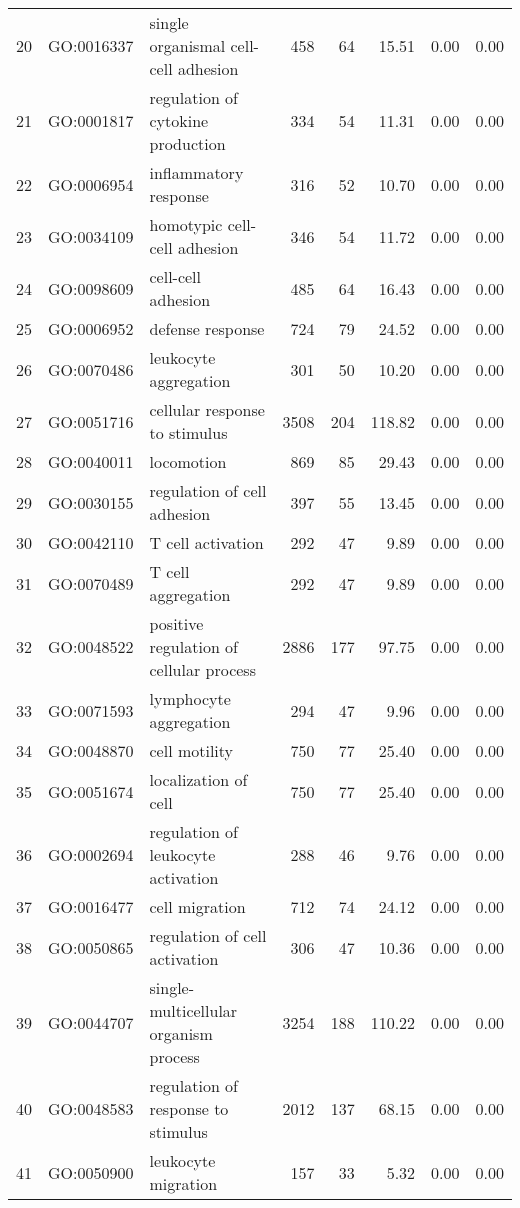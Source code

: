 \begin{table}[ht]
\begin{tabular}{rllrrrrr}
  20 & GO:0016337 & single organismal cell-cell adhesion & 458 &  64 & 15.51 & 0.00 & 0.00 \\ 
  21 & GO:0001817 & regulation of cytokine production & 334 &  54 & 11.31 & 0.00 & 0.00 \\ 
  22 & GO:0006954 & inflammatory response & 316 &  52 & 10.70 & 0.00 & 0.00 \\ 
  23 & GO:0034109 & homotypic cell-cell adhesion & 346 &  54 & 11.72 & 0.00 & 0.00 \\ 
  24 & GO:0098609 & cell-cell adhesion & 485 &  64 & 16.43 & 0.00 & 0.00 \\ 
  25 & GO:0006952 & defense response & 724 &  79 & 24.52 & 0.00 & 0.00 \\ 
  26 & GO:0070486 & leukocyte aggregation & 301 &  50 & 10.20 & 0.00 & 0.00 \\ 
  27 & GO:0051716 & cellular response to stimulus & 3508 & 204 & 118.82 & 0.00 & 0.00 \\ 
  28 & GO:0040011 & locomotion & 869 &  85 & 29.43 & 0.00 & 0.00 \\ 
  29 & GO:0030155 & regulation of cell adhesion & 397 &  55 & 13.45 & 0.00 & 0.00 \\ 
  30 & GO:0042110 & T cell activation & 292 &  47 & 9.89 & 0.00 & 0.00 \\ 
  31 & GO:0070489 & T cell aggregation & 292 &  47 & 9.89 & 0.00 & 0.00 \\ 
  32 & GO:0048522 & positive regulation of cellular process & 2886 & 177 & 97.75 & 0.00 & 0.00 \\ 
  33 & GO:0071593 & lymphocyte aggregation & 294 &  47 & 9.96 & 0.00 & 0.00 \\ 
  34 & GO:0048870 & cell motility & 750 &  77 & 25.40 & 0.00 & 0.00 \\ 
  35 & GO:0051674 & localization of cell & 750 &  77 & 25.40 & 0.00 & 0.00 \\ 
  36 & GO:0002694 & regulation of leukocyte activation & 288 &  46 & 9.76 & 0.00 & 0.00 \\ 
  37 & GO:0016477 & cell migration & 712 &  74 & 24.12 & 0.00 & 0.00 \\ 
  38 & GO:0050865 & regulation of cell activation & 306 &  47 & 10.36 & 0.00 & 0.00 \\ 
  39 & GO:0044707 & single-multicellular organism process & 3254 & 188 & 110.22 & 0.00 & 0.00 \\ 
  40 & GO:0048583 & regulation of response to stimulus & 2012 & 137 & 68.15 & 0.00 & 0.00 \\ 
  41 & GO:0050900 & leukocyte migration & 157 &  33 & 5.32 & 0.00 & 0.00 \\ 

\end{tabular}
\end{table}
